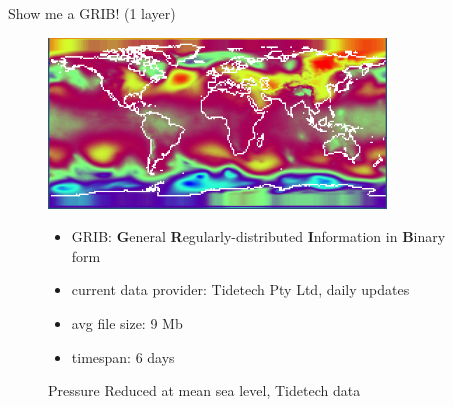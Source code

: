 \documentclass[xcolor=svgnames]{beamer}
\begin{document}
        \begin{frame}{Show me a GRIB! \small{(1 layer)}}
            \begin{figure}
                \centering
                \includegraphics[width=0.8\textwidth]{img/nc_screen}
                \caption{Pressure Reduced at mean sea level, Tidetech data}
                \label{fig:prmsl}
                \scriptsize
                \begin{itemize}
                    \item GRIB: \textbf{G}eneral \textbf{R}egularly-distributed \textbf{I}nformation in \textbf{B}inary form
                    \item current data provider: Tidetech Pty Ltd, daily updates
                    \item avg file size: 9 Mb
                    \item timespan: 6 days
                \end{itemize}
            \end{figure}
        \end{frame}
\end{document}
